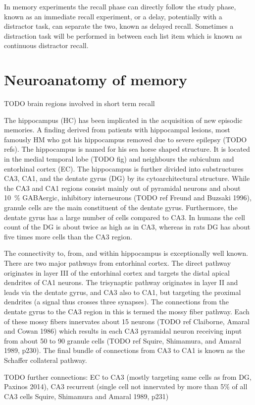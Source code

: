 In memory experiments the recall phase can directly follow the study phase, known as an immediate recall experiment, or a delay, potentially with a distractor task, can separate the two, known as delayed recall.
Sometimes a distraction task will be performed in between each list item which is known as continuous distractor recall.


\section{Neuroanatomy of memory}
TODO brain regions involved in short term recall

The hippocampus (HC) has been implicated in the acquisition of new episodic memories.
A finding derived from patients with hippocampal lesions, most famously HM who got his hippocampus removed due to severe epilepsy (TODO refs).
The hippocampus is named for his sea horse shaped structure.
It is located in the medial temporal lobe (TODO fig) and neighbours the subiculum and entorhinal cortex (EC).
The hippocampus is further divided into substructures CA3, CA1, and the dentate gyrus (DG) by its cytoarchitectural structure.
While the CA3 and CA1 regions consist mainly out of pyramidal neurons and about \SI{10}{\percent} GABAergic, inhibitory interneurons (TODO ref Freund and Buzsaki 1996), granule cells are the main constituent of the dentate gyrus.
Furthermore, the dentate gyrus has a large number of cells compared to CA3.
In humans the cell count of the DG is about twice as high as in CA3, whereas in rats DG has about five times more cells than the CA3 region.

The connectivity to, from, and within hippocampus is exceptionally well known.
There are two major pathways from entorhinal cortex.
The direct pathway originates in layer III of the entorhinal cortex and targets the distal apical dendrites of CA1 neurons.
The trisynaptic pathway originates in layer II and leads via the dentate gyrus, and CA3 also to CA1, but targeting the proximal dendrites (a signal thus crosses three synapses).
The connections from the dentate gyrus to the CA3 region in this is termed the mossy fiber pathway.
Each of these mossy fibers innervates about 15 neurons (TODO ref Claiborne, Amaral and Cowan 1986) which results in each CA3 pyramidal neuron receiving input from about 50 to 90 granule cells (TODO ref Squire, Shimamura, and Amaral 1989, p230).
The final bundle of connections from CA3 to CA1 is known as the Schaffer collateral pathway.

TODO further connections: EC to CA3 (mostly targeting same cells as from DG, Paxinos 2014), CA3 recurrent (single cell not innervated by more than 5\% of all CA3 cells Squire, Shimamura and Amaral 1989, p231)

